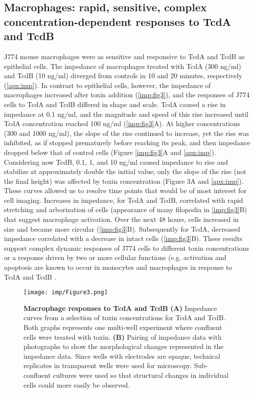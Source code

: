 \subsection{Macrophages: rapid, sensitive, complex concentration-dependent 
              responses to TcdA and TcdB}
J774 mouse macrophages were as sensitive and responsive to 
TcdA and TcdB as epithelial cells. The impedance of 
macrophages treated with TcdA (300 ng/ml) and TcdB (10 ng/ml) 
diverged from controls in 10 and 20 minutes, respectively 
(\autoref{apx:imp}). In contrast to epithelial cells, however, the 
impedance of macrophages increased after toxin addition (\autoref{imp:fig3}), 
and the responses of J774 cells to TcdA and TcdB differed in 
shape and scale. TcdA caused a rise in impedance at 0.1 ng/ml, 
and the magnitude and speed of this rise increased until 
TcdA concentration reached 100 ng/ml (\autoref{imp:fig3}A). At 
higher concentrations (300 and 1000 ng/ml), the slope of 
the rise continued to increase, yet the rise was inhibited, 
as if stopped prematurely before reaching its peak, and 
then impedance dropped below that of control cells (Figure \autoref{imp:fig3}A
and \autoref{apx:imp}). Considering now TcdB, 0.1, 1, and 10 ng/ml 
caused impedance to rise and stabilize at approximately double 
the initial value; only the slope of the rise (not the final 
height) was affected by toxin concentration (Figure 3A and 
\autoref{apx:imp}). These curves allowed us to resolve time 
points that would be of most interest for cell imaging. 
Increases in impedance, for TcdA and TcdB, correlated 
with rapid stretching and arborization of cells (appearance 
of many filopodia in \autoref{imp:fig3}B) that suggest macrophage 
activation. Over the next 48 hours, cells increased in size 
and became more circular (\autoref{imp:fig3}B). Subsequently for TcdA, 
decreased impedance correlated with a decrease in intact 
cells (\autoref{imp:fig3}B). These results support complex 
dynamic responses of J774 cells to different toxin 
concentrations or a response driven by two or more 
cellular functions (e.g. activation and apoptosis are 
known to occur in monocytes and macrophages in response 
to TcdA and TcdB \cite{Solomon:2005dv,Siffert:1993ue,Linevsky:1997wt,MeloFilho:1997ws}.

\begin{figure}[h!]
  \centering
  \texttt{[image: imp/Figure3.png]}
  \caption[Macrophage responses to TcdA and TcdB]{
       \textbf{Macrophage responses to TcdA and TcdB}
       \textbf{(A)} Impedance curves from a selection of toxin 
       concentrations for TcdA and TcdB. Both graphs 
       represents one multi-well experiment where confluent 
       cells were treated with toxin. 
       \textbf{(B)} Pairing of impedance data with photographs 
       to show the morphological changes represented 
       in the impedance data. Since wells with electrodes 
       are opaque, technical replicates in transparent 
       wells were used for microscopy. Sub-confluent 
       cultures were used so that structural changes 
       in individual cells could more easily be observed.
  }
  \label{imp:fig3}
\end{figure}

